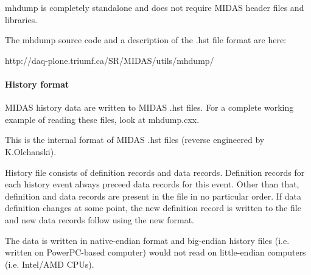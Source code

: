 mhdump is completely standalone and does not require MIDAS header files and libraries. 


The mhdump source code and a description of the .hst file format are here: 
\begin{DoxyCode}
http://daq-plone.triumf.ca/SR/MIDAS/utils/mhdump/
\end{DoxyCode}


\par


\par


\label{F_History_logging_idx_History_file_format}
\hypertarget{F_History_logging_idx_History_file_format}{}
 \hypertarget{F_History_logging_F_History_format}{}\paragraph{History format}\label{F_History_logging_F_History_format}
MIDAS history data are written to MIDAS .hst files. For a complete working example of reading these files, look at mhdump.cxx.

This is the internal format of MIDAS .hst files (reverse engineered by K.Olchanski).

History file consists of definition records and data records. Definition records for each history event always preceed data records for this event. Other than that, definition and data records are present in the file in no particular order. If data definition changes at some point, the new definition record is written to the file and new data records follow using the new format.

The data is written in native-\/endian format and big-\/endian history files (i.e. written on PowerPC-\/based computer) would not read on little-\/endian computers (i.e. Intel/AMD CPUs).

